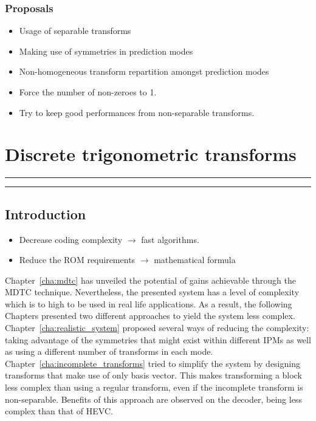 \documentclass[11pt,a4paper,openright,twoside]{book}
\providecommand{\chaptertoc}{
	\startcontents[chapters]
	\hrule
	\vspace{1em}
	\printcontents[chapters]{}{1}{{\bf\large Contents}}
	\hrule
}
\numberwithin{equation}{section} %
\numberwithin{figure}{section} %
\numberwithin{table}{section} %
\begin{document}
\subsection{Proposals}
\label{sub:proposals}

\begin{itemize}
	\item Usage of separable transforms
	\item Making use of symmetries in prediction modes
	\item Non-homogeneous transform repartition amongst prediction modes
\end{itemize}

\begin{itemize}
	\item Force the number of non-zeroes to 1.
	\item Try to keep good performances from non-separable transforms.
\end{itemize}

\chapter{Discrete trigonometric transforms}
\label{cha:discrete_trigonometric_transforms}
\chaptertoc

\section{Introduction}
\label{sec:introduction}

\begin{itemize}
	\item Decrease coding complexity $\rightarrow$ fast algorithms.
	\item Reduce the ROM requirements $\rightarrow$ mathematical formula
\end{itemize}

Chapter~\ref{cha:mdtc} has unveiled the potential of gains achievable through
the \ac{MDTC} technique.
Nevertheless, the presented system has a level of complexity which is to
high to be used in real life applications.
As a result, the following Chapters presented two different approaches to
yield the system less complex.
Chapter~\ref{cha:realistic_system} proposed several ways of reducing the
complexity: taking advantage of the symmetries that might exist within
different \acp{IPM} as well as using a different number of transforms in each
mode.
Chapter~\ref{cha:incomplete_transforms} tried to simplify the system by
designing transforms that make use of only basis vector.
This makes transforming a block less complex than using a regular transform,
even if the incomplete transform is non-separable.
Benefits of this approach are observed on the decoder, being less complex than
that of \ac{HEVC}.
\end{document}
